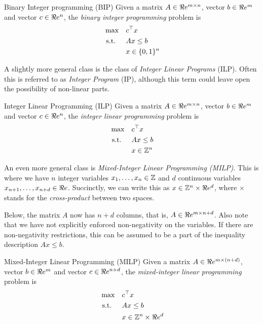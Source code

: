 \begin{general}{Binary Integer programming (BIP)}{\npcomplete}
Given a matrix $A \in \Re e^{m\times n}$, vector $b \in \Re e^m$ and vector $c \in \Re e^n$, the \emph{binary integer programming} problem is
\begin{equation}
\label{eq:BIP}
\begin{split}
\max \quad & c^\top x\\
\mbox{ s.t. }  \quad & Ax \leq b\\
& x \in \{0,1\}^n
\end{split}
\end{equation}
\end{general}
A slightly more general class is the class of \emph{Integer Linear Programs} (ILP).  Often this is referred to as \emph{Integer Program} (IP), although this term could leave open the possibility of non-linear parts.



\begin{general}{Integer Linear Programming (ILP)}{\npcomplete}
Given a matrix $A \in \Re e^{m\times n}$, vector $b \in \Re e^m$ and vector $c \in \Re e^n$, the \emph{integer linear programming} problem is
\begin{equation}
\label{eq:ILP}
\begin{split}
\max \quad & c^\top x\\
\mbox{ s.t. }  \quad & Ax \leq b\\
& x \in {\mathbb{Z}}^n
\end{split}
\end{equation}
\end{general}


An even more general class is \emph{Mixed-Integer Linear Programming (MILP)}.  This is where we have $n$ integer variables $x_1, \dots, x_n \in {\mathbb{Z}}$ and $d$ continuous variables $x_{n+1}, \dots, x_{n+d} \in \Re e$.  Succinctly, we can write this as $x \in {\mathbb{Z}}^n \times \Re e^d$, where $\times$ stands for the \emph{cross-product} between two spaces.   

Below, the matrix $A$ now has $n+d$ columns, that is, $A \in \Re e^{m \times n+d}$.  Also note that we have not explicitly enforced non-negativity on the variables.  If there are non-negativity restrictions, this can be assumed to be a part of the inequality description $Ax \leq b$.
\begin{general}{Mixed-Integer Linear Programming (MILP)}{\npcomplete}
Given a matrix $A \in \Re e^{m\times (n+d)}$, vector $b \in \Re e^m$ and vector $c \in \Re e^{n+d}$, the \emph{mixed-integer linear programming} problem is
\begin{equation}
\label{eq:ILP}
\begin{split}
\max \quad & c^\top x\\
\mbox{ s.t. }  \quad & Ax \leq b\\
& x \in {\mathbb{Z}}^n \times \Re e^d
\end{split}
\end{equation}
\end{general}

